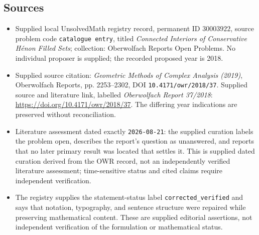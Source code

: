 \documentclass[11pt]{article}
\begin{document}
\subsection{Sources}
\begin{itemize}
\item Supplied local UnsolvedMath registry record, permanent ID \(30003922\), source problem code \texttt{catalogue entry}, titled \emph{Connected Interiors of Conservative Hénon Filled Sets}; collection: Oberwolfach Reports Open Problems. No individual proposer is supplied; the recorded proposed year is 2018.
\item Supplied source citation: \emph{Geometric Methods of Complex Analysis (2019)}, Oberwolfach Reports, pp. 2253--2302, DOI \texttt{10.4171/owr/2018/37}. Supplied source and literature link, labelled \emph{Oberwolfach Report 37/2018}: \url{https://doi.org/10.4171/owr/2018/37}. The differing year indications are preserved without reconciliation.
\item Literature assessment dated exactly \texttt{2026-08-21}: the supplied curation labels the problem open, describes the report's question as unanswered, and reports that no later primary result was located that settles it. This is supplied dated curation derived from the OWR record, not an independently verified literature assessment; time-sensitive status and cited claims require independent verification.
\item The registry supplies the statement-status label \texttt{corrected\_verified} and says that notation, typography, and sentence structure were repaired while preserving mathematical content. These are supplied editorial assertions, not independent verification of the formulation or mathematical status.
\end{itemize}
\end{document}
